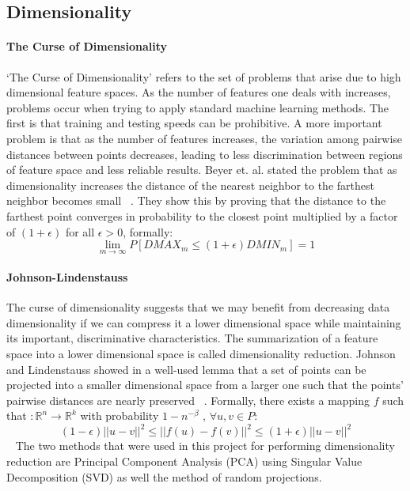 \subsection{Dimensionality}
\paragraph{The Curse of Dimensionality} %
\label{par:paragraph_name}
`The Curse of Dimensionality' refers to the set of problems that arise due to high dimensional feature spaces. As the number of features one deals with increases, problems occur when trying to apply standard machine learning methods. The first is that training and testing speeds can be prohibitive.  A more important problem is that as the number of features increases, the variation among pairwise distances between points decreases, leading to less discrimination between regions of feature space and less reliable results. Beyer et. al. stated the problem that as dimensionality increases the distance of the nearest neighbor to the farthest neighbor becomes small ~\cite{beyer1999nearest}. They show this by proving that the distance to the farthest point converges in probability to the closest point multiplied by a factor of $(1+\epsilon)$ for all $\epsilon > 0$, formally:
\begin{equation}
	\lim_{m\rightarrow \infty} P[DMAX_m \le (1+\epsilon)DMIN_m]=1
\end{equation}
\paragraph{Johnson-Lindenstauss} %
\label{par:johnson_lindenstauss}
The curse of dimensionality suggests that we may benefit from decreasing data dimensionality if we can compress it a lower dimensional space while maintaining its important, discriminative characteristics. The summarization of a feature space into a lower dimensional space is called dimensionality reduction. Johnson and Lindenstauss  showed in a well-used lemma that a set of points can be projected into a smaller dimensional space from a larger one such that the points' pairwise distances are nearly preserved ~\cite{johnson1984extensions}. Formally, there exists a mapping $f$ such that $:\mathbb{R}^n \rightarrow \mathbb{R}^k$ with probability $1-n^{-\beta}$ ,  $\forall u,v \in P$:
\begin{equation}
	(1 - \epsilon)||u - v||^2 \le ||f(u)-f(v)||^2 \le (1+\epsilon)||u-v||^2
\end{equation}  ~\cite{achlioptas2001database} The two methods that were used in this project for performing dimensionality reduction are Principal Component Analysis (PCA) using Singular Value Decomposition (SVD) as well the method of random projections.
